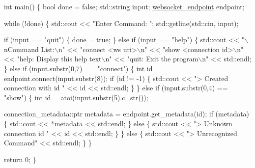 \begin{DoxyCode}
\textcolor{keywordtype}{int} main() \{
    \textcolor{keywordtype}{bool} done = \textcolor{keyword}{false};
    std::string input;
    \mbox{\hyperlink{classwebsocket__endpoint}{websocket\_endpoint}} endpoint;

    \textcolor{keywordflow}{while} (!done) \{
        std::cout << \textcolor{stringliteral}{"Enter Command: "};
        std::getline(std::cin, input);

        \textcolor{keywordflow}{if} (input == \textcolor{stringliteral}{"quit"}) \{
            done = \textcolor{keyword}{true};
        \} \textcolor{keywordflow}{else} \textcolor{keywordflow}{if} (input == \textcolor{stringliteral}{"help"}) \{
            std::cout
                << \textcolor{stringliteral}{"\(\backslash\)nCommand List:\(\backslash\)n"}
                << \textcolor{stringliteral}{"connect <ws uri>\(\backslash\)n"}
                << \textcolor{stringliteral}{"show <connection id>\(\backslash\)n"}
                << \textcolor{stringliteral}{"help: Display this help text\(\backslash\)n"}
                << \textcolor{stringliteral}{"quit: Exit the program\(\backslash\)n"}
                << std::endl;
        \} \textcolor{keywordflow}{else} \textcolor{keywordflow}{if} (input.substr(0,7) == \textcolor{stringliteral}{"connect"}) \{
            \textcolor{keywordtype}{int} \textcolor{keywordtype}{id} = endpoint.connect(input.substr(8));
            \textcolor{keywordflow}{if} (\textcolor{keywordtype}{id} != -1) \{
                std::cout << \textcolor{stringliteral}{"> Created connection with id "} << \textcolor{keywordtype}{id} << std::endl;
            \}
        \} \textcolor{keywordflow}{else} \textcolor{keywordflow}{if} (input.substr(0,4) == \textcolor{stringliteral}{"show"}) \{
            \textcolor{keywordtype}{int} \textcolor{keywordtype}{id} = atoi(input.substr(5).c\_str());

            connection\_metadata::ptr metadata = endpoint.get\_metadata(\textcolor{keywordtype}{id});
            \textcolor{keywordflow}{if} (metadata) \{
                std::cout << *metadata << std::endl;
            \} \textcolor{keywordflow}{else} \{
                std::cout << \textcolor{stringliteral}{"> Unknown connection id "} << \textcolor{keywordtype}{id} << std::endl;
            \}
        \} \textcolor{keywordflow}{else} \{
            std::cout << \textcolor{stringliteral}{"> Unrecognized Command"} << std::endl;
        \}
    \}

    \textcolor{keywordflow}{return} 0;
\}
\end{DoxyCode}


